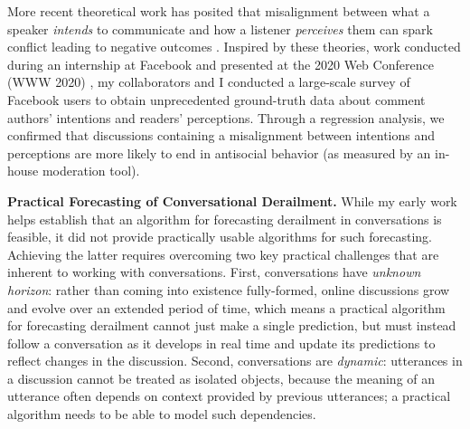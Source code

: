 \documentclass[11pt,letterpaper]{article}
\renewcommand{\section}[1]{\vspace{0.25\baselineskip}\noindent\textbf{#1.}}
\begin{document}
More recent theoretical work has posited that misalignment between what a speaker \emph{intends} to communicate and how a listener \emph{perceives} them can spark conflict leading to negative outcomes \cite{tannen_indirectness_2000}.
Inspired by these theories, work conducted during an internship at Facebook and presented at the 2020 Web Conference (WWW 2020) \cite{chang_dont_2020}, my collaborators and I conducted a large-scale survey of Facebook users to obtain unprecedented ground-truth data about comment authors' intentions and readers' perceptions.
Through a regression analysis, we confirmed that discussions containing a misalignment between intentions and perceptions are more likely to end in antisocial behavior (as measured by an in-house moderation tool).

\section{Practical Forecasting of Conversational Derailment}
While my early work helps establish that an algorithm for forecasting derailment in conversations is feasible, it did not provide practically usable algorithms for such forecasting.
Achieving the latter requires overcoming two key practical challenges that are inherent to working with conversations.
First, conversations have \emph{unknown horizon}: rather than coming into existence fully-formed, online discussions grow and evolve over an extended period of time, which means a practical algorithm for forecasting derailment cannot just make a single prediction, but must instead follow a conversation as it develops in real time and update its predictions to reflect changes in the discussion.
Second, conversations are \emph{dynamic}: utterances in a discussion cannot be treated as isolated objects, because the meaning of an utterance often depends on context provided by previous utterances; a practical algorithm needs to be able to model such dependencies.
\end{document}
